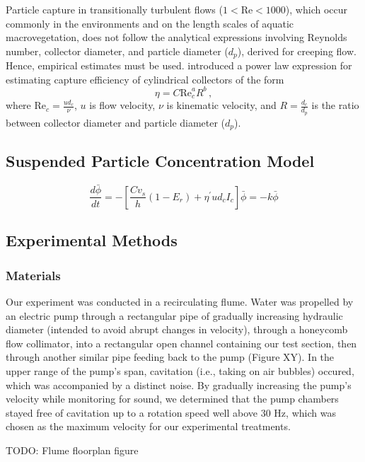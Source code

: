 \documentclass[10pt,a4paper]{article}
\newcommand\Rey{\mathrm{Re}}
\begin{document}
Particle capture in transitionally turbulent flows ($1<\Rey<1000$), which occur commonly in the environments and on the length scales of aquatic macrovegetation, does not follow the analytical expressions involving Reynolds number, collector diameter, and particle diameter ($d_p$), derived for creeping flow. Hence, empirical estimates must be used. \citet{Palmer_2004} introduced a power law expression for estimating capture efficiency of cylindrical collectors of the form $$\eta=C\Rey_c^{a}R^{b}\,,$$ where $\Rey_c=\frac{ud_c}{\nu}$, $u$ is flow velocity, $\nu$ is kinematic velocity, and $R=\frac{d_c}{d_p}$ is the ratio between collector diameter and particle diameter ($d_p$).

\subsection{Suspended Particle Concentration Model}

$$\frac{d\bar{\phi}}{dt} = -[\frac{Cv_s}{h}(1-E_r) + \eta^{\prime}ud_cI_c]\bar{\phi} = -k\bar{\phi}$$

\subsection{Experimental Methods}

\subsubsection{Materials}

Our experiment was conducted in a recirculating flume. Water was propelled by an electric pump through a rectangular pipe of gradually increasing hydraulic diameter (intended to avoid abrupt changes in velocity), through a honeycomb flow collimator, into a rectangular open channel containing our test section, then through another similar pipe feeding back to the pump (Figure XY). In the upper range of the pump's span, cavitation (i.e., taking on air bubbles) occured, which was accompanied by a distinct noise. By gradually increasing the pump's velocity while monitoring for sound, we determined that the pump chambers stayed free of cavitation up to a rotation speed well above 30 Hz, which was chosen as the maximum velocity for our experimental treatments.

TODO: Flume floorplan figure
\end{document}
